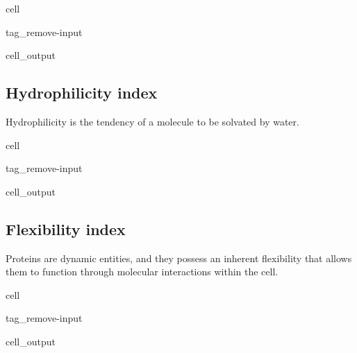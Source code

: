 \documentclass[letterpaper,10pt,english]{jupyterBook}
\begin{document}
\begin{sphinxuseclass}{cell}
\begin{sphinxuseclass}{tag_remove-input}\begin{sphinxVerbatimOutput}

\begin{sphinxuseclass}{cell_output}
\noindent{}

\end{sphinxuseclass}\end{sphinxVerbatimOutput}

\end{sphinxuseclass}
\end{sphinxuseclass}

\subsection{Hydrophilicity index}
\label{\detokenize{ipynb/chapter1:hydrophilicity-index}}
\sphinxAtStartPar
Hydrophilicity is the tendency of a molecule to be solvated by water.

\begin{sphinxuseclass}{cell}
\begin{sphinxuseclass}{tag_remove-input}\begin{sphinxVerbatimOutput}

\begin{sphinxuseclass}{cell_output}
\noindent{}

\end{sphinxuseclass}\end{sphinxVerbatimOutput}

\end{sphinxuseclass}
\end{sphinxuseclass}

\subsection{Flexibility index}
\label{\detokenize{ipynb/chapter1:flexibility-index}}
\sphinxAtStartPar
Proteins are dynamic entities, and they possess an inherent flexibility that allows them to function through molecular interactions within the cell.

\begin{sphinxuseclass}{cell}
\begin{sphinxuseclass}{tag_remove-input}\begin{sphinxVerbatimOutput}

\begin{sphinxuseclass}{cell_output}
\noindent{}

\end{sphinxuseclass}\end{sphinxVerbatimOutput}

\end{sphinxuseclass}
\end{sphinxuseclass}
\end{document}
